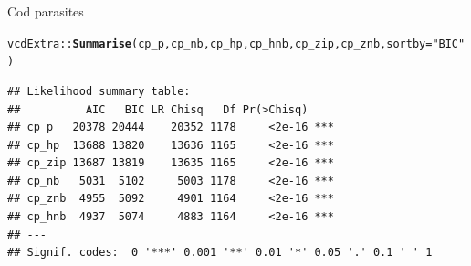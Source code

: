 \documentclass[11pt]{book}\usepackage[]{graphicx}\usepackage[]{color}
\makeatletter
\newcommand{\hlstr}[1]{\textcolor[rgb]{0.192,0.494,0.8}{#1}}%
\newcommand{\hlstd}[1]{\textcolor[rgb]{0.345,0.345,0.345}{#1}}%
\newcommand{\hlkwc}[1]{\textcolor[rgb]{0.333,0.667,0.333}{#1}}%
\newcommand{\hlkwd}[1]{\textcolor[rgb]{0.737,0.353,0.396}{\textbf{#1}}}%
\newenvironment{kframe}{%
 \def\at@end@of@kframe{}%
 \ifinner\ifhmode%
  \def\at@end@of@kframe{\end{minipage}}%
  \begin{minipage}{\columnwidth}%
 \fi\fi%
 \def\FrameCommand##1{\hskip\@totalleftmargin \hskip-\fboxsep
 \colorbox{shadecolor}{##1}\hskip-\fboxsep
     \hskip-\linewidth \hskip-\@totalleftmargin \hskip\columnwidth}%
 \MakeFramed {\advance\hsize-\width
   \@totalleftmargin\z@ \linewidth\hsize
   \@setminipage}}%
 {\par\unskip\endMakeFramed%
 \at@end@of@kframe}
\newenvironment{knitrout}{}{} %
\renewenvironment{knitrout}{\small\renewcommand{\baselinestretch}{.85}}{} %
\makeatother
\begin{document}
\begin{Example}[cod2]{Cod parasites}
\begin{knitrout}
\color{fgcolor}\begin{kframe}
\begin{alltt}
\hlstd{vcdExtra::}\hlkwd{Summarise}\hlstd{(cp_p, cp_nb, cp_hp, cp_hnb, cp_zip, cp_znb,} \hlkwc{sortby}\hlstd{=}\hlstr{"BIC"}\hlstd{)}
\end{alltt}
\begin{verbatim}
## Likelihood summary table:
##          AIC   BIC LR Chisq   Df Pr(>Chisq)    
## cp_p   20378 20444    20352 1178     <2e-16 ***
## cp_hp  13688 13820    13636 1165     <2e-16 ***
## cp_zip 13687 13819    13635 1165     <2e-16 ***
## cp_nb   5031  5102     5003 1178     <2e-16 ***
## cp_znb  4955  5092     4901 1164     <2e-16 ***
## cp_hnb  4937  5074     4883 1164     <2e-16 ***
## ---
## Signif. codes:  0 '***' 0.001 '**' 0.01 '*' 0.05 '.' 0.1 ' ' 1
\end{verbatim}
\end{kframe}
\end{knitrout}


\end{Example}
\end{document}

